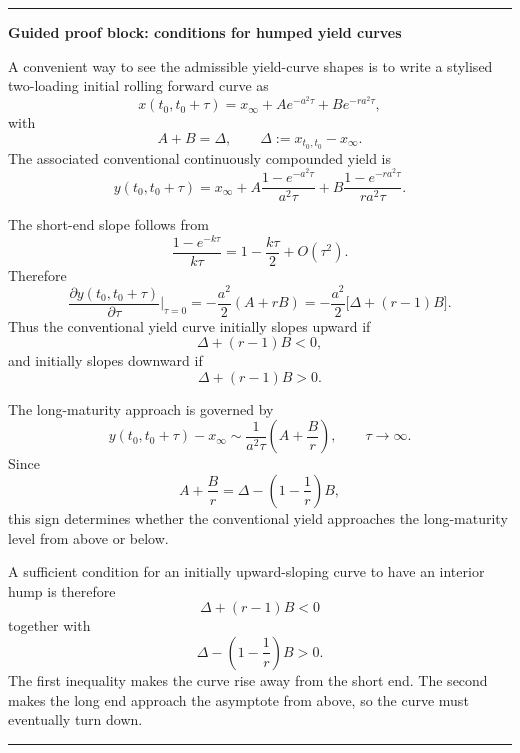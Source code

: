 \documentclass[11pt]{article}
\theoremstyle{plainbreak}
\newenvironment{proofblock}[1]{%
    \vspace{0.5em}\hrule\vspace{0.7em}%
    {\bfseries Guided proof block: #1}\par\vspace{0.2em}%
}{%
    \vspace{0.5em}\hrule\vspace{0.7em}%
}
\begin{document}
\begin{proofblock}{conditions for humped yield curves}
A convenient way to see the admissible yield-curve shapes is to write a stylised two-loading initial rolling forward curve as
\begin{equation*}
    x(t_0,t_0+\tau)=x_\infty+A e^{-a^2\tau}+B e^{-ra^2\tau},
\end{equation*}
with
\begin{equation*}
    A+B=\Delta,
    \qquad
    \Delta:=x_{t_0,t_0}-x_\infty.
\end{equation*}
The associated conventional continuously compounded yield is
\begin{equation*}
    y(t_0,t_0+\tau)
    =x_\infty
    +A\frac{1-e^{-a^2\tau}}{a^2\tau}
    +B\frac{1-e^{-ra^2\tau}}{ra^2\tau}.
\end{equation*}

The short-end slope follows from
\begin{equation*}
    \frac{1-e^{-k\tau}}{k\tau}=1-\frac{k\tau}{2}+O(\tau^2).
\end{equation*}
Therefore
\begin{equation*}
    \frac{\partial y(t_0,t_0+\tau)}{\partial \tau}\bigg|_{\tau=0}
    =-\frac{a^2}{2}(A+rB)
    =-\frac{a^2}{2}\bigl[\Delta+(r-1)B\bigr].
\end{equation*}
Thus the conventional yield curve initially slopes upward if
\begin{equation*}
    \Delta+(r-1)B<0,
\end{equation*}
and initially slopes downward if
\begin{equation*}
    \Delta+(r-1)B>0.
\end{equation*}

The long-maturity approach is governed by
\begin{equation*}
    y(t_0,t_0+\tau)-x_\infty
    \sim
    \frac{1}{a^2\tau}\left(A+\frac{B}{r}\right),
    \qquad \tau\to\infty.
\end{equation*}
Since
\begin{equation*}
    A+\frac{B}{r}
    =\Delta-\left(1-\frac{1}{r}\right)B,
\end{equation*}
this sign determines whether the conventional yield approaches the long-maturity level from above or below.

A sufficient condition for an initially upward-sloping curve to have an interior hump is therefore
\begin{equation*}
    \Delta+(r-1)B<0
\end{equation*}
together with
\begin{equation*}
    \Delta-\left(1-\frac{1}{r}\right)B>0.
\end{equation*}
The first inequality makes the curve rise away from the short end. The second makes the long end approach the asymptote from above, so the curve must eventually turn down.


\end{proofblock}
\end{document}
